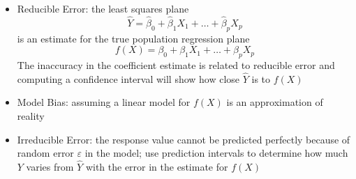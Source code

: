 \documentclass[12pt]{article}
\begin{document}
\begin{itemize}
\begin{itemize}
\item Reducible Error: the least squares plane $$ \hat{Y} = \hat{\beta}_0 + \hat{\beta}_1X_1 + \dots + \hat{\beta}_pX_p $$ 
is an estimate for the true population regression plane $$ f(X) = \beta_0 + \beta_1X_1 + \dots + \beta_pX_p $$ 
The inaccuracy in the coefficient estimate is related to reducible error and computing a confidence interval will show how close $\hat{Y}$ is to $f(X)$
\item Model Bias: assuming a linear model for $f(X)$ is an approximation of reality 
\item Irreducible Error: the response value cannot be predicted perfectly because of random error $\varepsilon$ in the model; use prediction intervals to determine how much $Y$ varies from $\hat{Y}$ with the error in the estimate for $f(X)$ \end{itemize} 
\end{itemize} 
\end{document}
